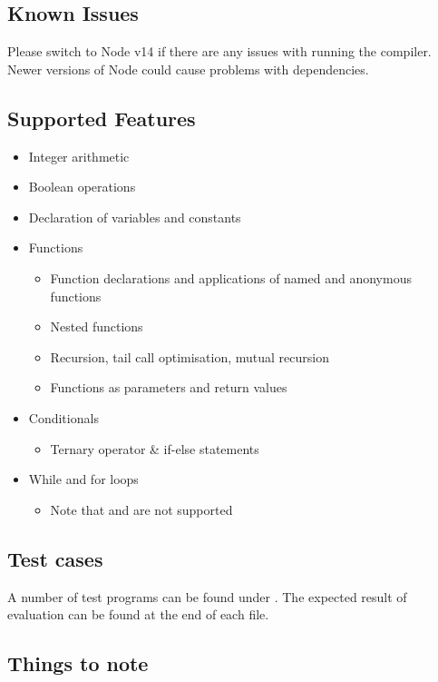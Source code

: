 \subsection{Known Issues}
Please switch to Node v14 if there are any issues with running the compiler. Newer versions of Node could cause problems with dependencies. 

\subsection{Supported Features}
\begin{itemize}
  \item Integer arithmetic
  \item Boolean operations
  \item Declaration of variables and constants
  \item Functions
    \begin{itemize}
      \item Function declarations and applications of named and anonymous functions
      \item Nested functions
      \item Recursion, tail call optimisation, mutual recursion
      \item Functions as parameters and return values
    \end{itemize}
  \item Conditionals
    \begin{itemize}
      \item Ternary operator \& if-else statements
    \end{itemize}
  \item While and for loops
    \begin{itemize}
      \item Note that  and  are not supported
    \end{itemize}
\end{itemize}

\subsection{Test cases}
A number of test programs can be found under . The expected result of evaluation can be found at the end of each file. 

\subsection{Things to note}
